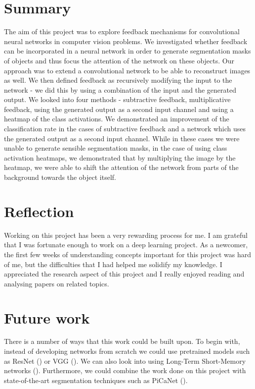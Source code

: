 \documentclass{l4proj}
\begin{document}
\section{Summary}
The aim of this project was to explore feedback mechanisms for convolutional neural networks in computer vision problems. We investigated whether feedback can be incorporated in a neural network in order to generate segmentation masks of objects and thus focus the attention of the network on these objects. Our approach was to extend a convolutional network to be able to reconstruct images as well. We then defined feedback as recursively modifying the input to the network - we did this by using a combination of the input and the generated output. We looked into four methods - subtractive feedback, multiplicative feedback, using the generated output as a second input channel and using a heatmap of the class activations. We demonstrated an improvement of the classification rate in the cases of subtractive feedback and a network which uses the generated output as a second input channel. While in these cases we were unable to generate sensible segmentation masks, in the case of using class activation heatmaps, we demonstrated that by multiplying the image by the heatmap, we were able to shift the attention of the network from parts of the background towards the object itself.

\section{Reflection}
Working on this project has been a very rewarding process for me. I am grateful that I was fortunate enough to work on a deep learning project. As a newcomer, the first few weeks of understanding concepts important for this project was hard of me, but the difficulties that I had helped me solidify my knowledge. I appreciated the research aspect of this project and I really enjoyed reading and analysing papers on related topics.

\section{Future work}
There is a number of ways that this work could be built upon. To begin with, instead of developing networks from scratch we could use pretrained models such as ResNet (\cite{resnet}) or VGG (\cite{vgg}). We can also look into using Long-Term Short-Memory networks (\cite{lstm}). 
Furthermore, we could combine the work done on this project with state-of-the-art segmentation techniques such as PiCaNet  (\cite{picanet}).
\end{document}
